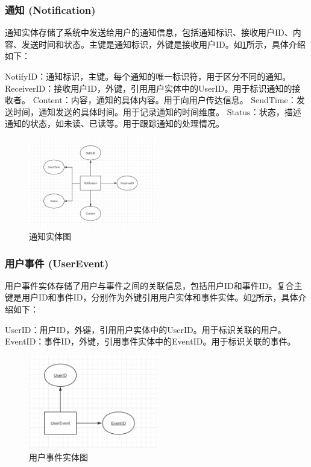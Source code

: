\subsubsection{通知 (Notification)}

通知实体存储了系统中发送给用户的通知信息，包括通知标识、接收用户ID、内容、发送时间和状态。主键是通知标识，外键是接收用户ID。如\cref{fig:entity-notification}所示，具体介绍如下：

NotifyID：通知标识，主键。每个通知的唯一标识符，用于区分不同的通知。
ReceiverID：接收用户ID，外键，引用用户实体中的UserID。用于标识通知的接收者。
Content：内容，通知的具体内容。用于向用户传达信息。
SendTime：发送时间，通知发送的具体时间。用于记录通知的时间维度。
Status：状态，描述通知的状态，如未读、已读等。用于跟踪通知的处理情况。

\begin{figure}[htbp]
    \centering
    \includegraphics[width=0.5\textwidth]{figures/db-img-04.png}
    \caption{通知实体图}
    \label{fig:entity-notification}
\end{figure}

\subsubsection{用户事件 (UserEvent)}

用户事件实体存储了用户与事件之间的关联信息，包括用户ID和事件ID。复合主键是用户ID和事件ID，分别作为外键引用用户实体和事件实体。如\cref{fig:entity-userevent}所示，具体介绍如下：

UserID：用户ID，外键，引用用户实体中的UserID。用于标识关联的用户。
EventID：事件ID，外键，引用事件实体中的EventID。用于标识关联的事件。

\begin{figure}[htbp]
    \centering
    \includegraphics[width=0.5\textwidth]{figures/db-img-05.png}
    \caption{用户事件实体图}
    \label{fig:entity-userevent}
\end{figure}

